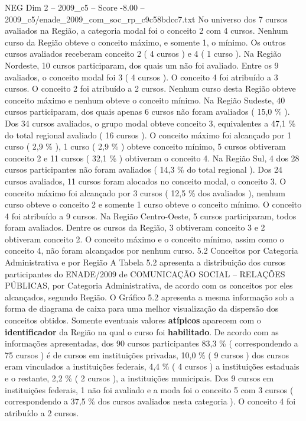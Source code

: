 \begin{textsample}{NEG Dim 2 – 2009\_c5 – Score -8.00 – 2009\_c5/enade\_2009\_com\_soc\_rp\_c9c58bdcc7.txt}
No universo dos 7 cursos avaliados na Região, a categoria modal foi o conceito 2 com 4 cursos.
Nenhum curso da Região obteve o conceito máximo, e somente 1, o mínimo.
Os outros cursos avaliados receberam conceito 2 ( 4 cursos ) e 4 ( 1 curso ).
Na Região Nordeste, 10 cursos participaram, dos quais um não foi avaliado.
Entre os 9 avaliados, o conceito modal foi 3 ( 4 cursos ).
O conceito 4 foi atribuído a 3 cursos.
O conceito 2 foi atribuído a 2 cursos.
Nenhum curso desta Região obteve conceito máximo e nenhum obteve o conceito mínimo.
Na Região Sudeste, 40 cursos participaram, dos quais apenas 6 cursos não foram avaliados ( 15,0 \% ).
Dos 34 cursos avaliados, o grupo modal obteve conceito 3, equivalentes a 47,1 \% do total regional avaliado ( 16 cursos ).
O conceito máximo foi alcançado por 1 curso ( 2,9 \% ), 1 curso ( 2,9 \% ) obteve conceito mínimo, 5 cursos obtiveram conceito 2 e 11 cursos ( 32,1 \% ) obtiveram o conceito 4.
Na Região Sul, 4 dos 28 cursos participantes não foram avaliados ( 14,3 \% do total regional ).
Dos 24 cursos avaliados, 11 cursos foram alocados no conceito modal, o conceito 3.
O conceito máximo foi alcançado por 3 cursos ( 12,5 \% dos avaliados ), nenhum curso obteve o conceito 2 e somente 1 curso obteve o conceito mínimo.
O conceito 4 foi atribuído a 9 cursos.
Na Região Centro-Oeste, 5 cursos participaram, todos foram avaliados.
Dentre os cursos da Região, 3 obtiveram conceito 3 e 2 obtiveram conceito 2.
O conceito máximo e o conceito mínimo, assim como o conceito 4, não foram alcançados por nenhum curso. 5.2 Conceitos por Categoria Administrativa e por Região A Tabela 5.2 apresenta a distribuição dos cursos participantes do ENADE/2009 de COMUNICAÇÃO SOCIAL – RELAÇÕES PÚBLICAS, por Categoria Administrativa, de acordo com os conceitos por eles alcançados, segundo Região.
O Gráfico 5.2 apresenta a mesma informação sob a forma de diagrama de caixa para uma melhor visualização da dispersão dos conceitos obtidos.
Somente eventuais valores \textbf{atípicos} aparecem com o \textbf{identificador} da Região na qual o curso foi \textbf{habilitado}.
De acordo com as informações apresentadas, dos 90 cursos participantes 83,3 \% ( correspondendo a 75 cursos ) é de cursos em instituições privadas, 10,0 \% ( 9 cursos ) dos cursos eram vinculados a instituições federais, 4,4 \% ( 4 cursos ) a instituições estaduais e o restante, 2,2 \% ( 2 cursos ), a instituições municipais.
Dos 9 cursos em instituições federais, 1 não foi avaliado e a moda foi o conceito 5 com 3 cursos ( correspondendo a 37,5 \% dos cursos avaliados nesta categoria ).
O conceito 4 foi atribuído a 2 cursos.

\end{textsample}
